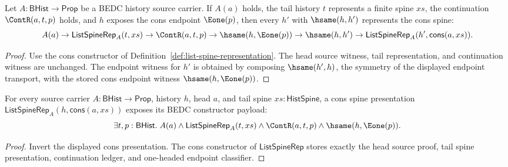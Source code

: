 \begin{lemma}
\label{lem:list-spine-rep-cons-hsame-transport}
Let $A:\mathsf{BHist}\to\mathsf{Prop}$ be a BEDC history source carrier. If
$A(a)$ holds, the tail history $t$ represents a finite spine $xs$, the
continuation $\ContR(a,t,p)$ holds, and $h$ exposes the cons endpoint
$\Eone(p)$, then every $h'$ with $\hsame(h,h')$ represents the cons spine:
$$
A(a)\to \mathsf{ListSpineRep}_A(t,xs)\to \ContR(a,t,p)\to
\hsame(h,\Eone(p))\to\hsame(h,h')\to
\mathsf{ListSpineRep}_A(h',\mathsf{cons}(a,xs)).
$$
\end{lemma}
\begin{proof}
Use the cons constructor of Definition~\ref{def:list-spine-representation}.
The head source witness, tail representation, and continuation witness are
unchanged. The endpoint witness for $h'$ is obtained by composing
$\hsame(h',h)$, the symmetry of the displayed endpoint transport, with the
stored cons endpoint witness $\hsame(h,\Eone(p))$.
\end{proof}

\begin{theorem}
\label{thm:list-spine-rep-cons-endpoint-shape}
For every source carrier $A:\mathsf{BHist}\to\mathsf{Prop}$, history $h$,
head $a$, and tail spine $xs:\mathsf{HistSpine}$, a cons spine presentation
$\mathsf{ListSpineRep}_A(h,\mathsf{cons}(a,xs))$ exposes its BEDC constructor
payload:
$$
\exists t,p:\mathsf{BHist}.\;
A(a)\land\mathsf{ListSpineRep}_A(t,xs)\land\ContR(a,t,p)\land
\hsame(h,\Eone(p)).
$$
\end{theorem}
\begin{proof}
Invert the displayed cons presentation. The cons constructor of
$\mathsf{ListSpineRep}$ stores exactly the head source proof, tail spine
presentation, continuation ledger, and one-headed endpoint classifier.
\end{proof}

